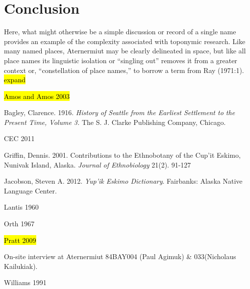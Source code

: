 \section{Conclusion}
Here, what might otherwise be a simple discussion or record of a single name provides an example of the complexity associated with toponymic research. Like many named places, Aternermiut may be clearly delineated in space, but like all place names its linguistic isolation or “singling out” removes it from a greater context or, “constellation of place names,” to borrow a term from Ray (1971:1). \hl{expand}


\begin{hang}

\hl{Amos and Amos 2003}

Bagley, Clarence. 1916. \textit{History of Seattle from the Earliest Settlement to the Present Time, Volume 3.} The S. J. Clarke Publishing Company, Chicago.

CEC 2011

Griffin, Dennis. 2001. Contributions to the Ethnobotany of the Cup’it Eskimo, Nunivak Island, Alaska. \textit{Journal of Ethnobiology} 21(2). 91-127

Jacobson, Steven A. 2012. \textit{Yup'ik Eskimo Dictionary}. Fairbanks: Alaska Native Language Center.

Lantis 1960

Orth 1967

\hl{Pratt 2009}

On-site interview at Aternermiut 84BAY004 (Paul Agimuk) \& 033(Nicholaus Kailukiak).

Williams 1991

\end{hang}


\label{drozda-ch-end}
